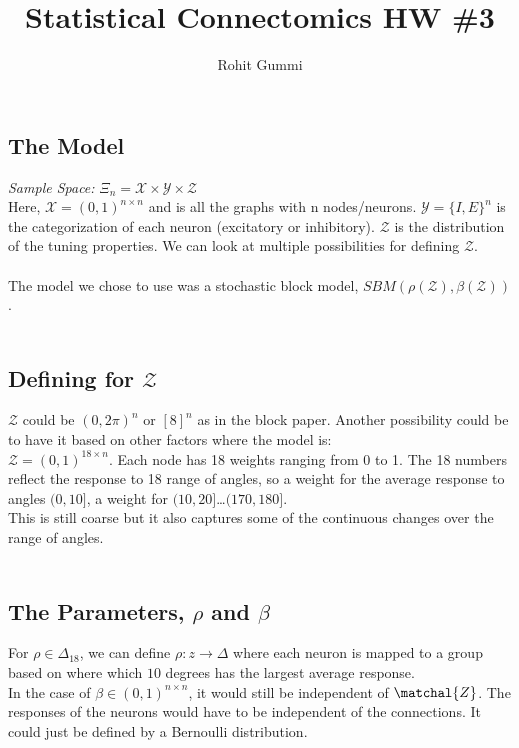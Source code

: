 \documentclass[12pt]{article}
\begin{document}
\title{Statistical Connectomics HW \#3}
\author{Rohit Gummi}
\maketitle
\subsection*{The Model}
\emph{Sample Space:} $\Xi_n=\mathcal{X} \times \mathcal{Y} \times \mathcal{Z}$
\\Here, $\mathcal{X}=(0,1)^{n \times n}$ and is all the graphs with n nodes/neurons. $\mathcal{Y}=\{I,E\}^n$ is the categorization of each neuron (excitatory or inhibitory). $\mathcal{Z}$  is the distribution of the tuning properties. We can look at multiple possibilities for defining $\mathcal{Z}$.
\\
\\The model we chose to use was a stochastic block model, $SBM(\rho (\mathcal{Z}),\beta (\mathcal{Z}))$.
\\
\\\subsection*{Defining for $\mathcal{Z}$}
$\mathcal{Z}$ could be $(0,2\pi)^n$ or $[8]^n$ as in the block paper. Another possibility could be to have it based on other factors where the model is: 
\\ $\mathcal{Z}=(0,1)^{18 \times n}$. Each node has 18 weights ranging from 0 to 1. The 18 numbers reflect the response to 18 range of angles, so a weight for the average response to angles $(0,10]$, a weight for $(10,20]$\ldots$(170, 180]$.
\\This is still coarse but it also captures some of the continuous changes over the range of angles.
\\
\\\subsection*{The Parameters, $\rho$ and $\beta$}
For $\rho \in \Delta_{18}$, we can define $\rho: z \to \Delta$ where each neuron is mapped to a group based on where which $10$ degrees has the largest average response. 
\\In the case of $\beta \in (0,1)^{n \times n}$, it would still be independent of $\matchal{Z}$. The responses of the neurons would have to be independent of the connections. It could just be defined by a Bernoulli distribution.
\end{document}
